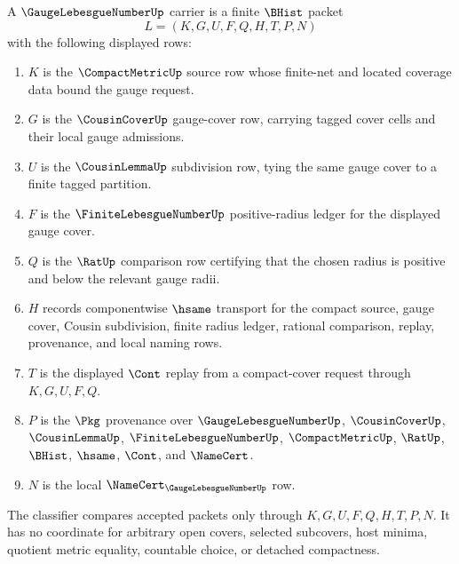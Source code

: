 \begin{definition}
\label{def:gauge-lebesgue-number-carrier}
A $\GaugeLebesgueNumberUp$ carrier is a finite $\BHist$ packet
$$
L=(K,G,U,F,Q,H,T,P,N)
$$
with the following displayed rows:
\begin{enumerate}
\item $K$ is the $\CompactMetricUp$ source row whose finite-net and located coverage data bound the gauge request.
\item $G$ is the $\CousinCoverUp$ gauge-cover row, carrying tagged cover cells and their local gauge admissions.
\item $U$ is the $\CousinLemmaUp$ subdivision row, tying the same gauge cover to a finite tagged partition.
\item $F$ is the $\FiniteLebesgueNumberUp$ positive-radius ledger for the displayed gauge cover.
\item $Q$ is the $\RatUp$ comparison row certifying that the chosen radius is positive and below the relevant gauge radii.
\item $H$ records componentwise $\hsame$ transport for the compact source, gauge cover, Cousin subdivision, finite radius ledger, rational comparison, replay, provenance, and local naming rows.
\item $T$ is the displayed $\Cont$ replay from a compact-cover request through $K,G,U,F,Q$.
\item $P$ is the $\Pkg$ provenance over $\GaugeLebesgueNumberUp$, $\CousinCoverUp$, $\CousinLemmaUp$, $\FiniteLebesgueNumberUp$, $\CompactMetricUp$, $\RatUp$, $\BHist$, $\hsame$, $\Cont$, and $\NameCert$.
\item $N$ is the local $\NameCert_{\GaugeLebesgueNumberUp}$ row.
\end{enumerate}
The classifier compares accepted packets only through $K,G,U,F,Q,H,T,P,N$. It has no coordinate for arbitrary open covers, selected subcovers, host minima, quotient metric equality, countable choice, or detached compactness.
\end{definition}

